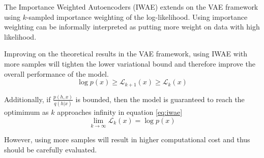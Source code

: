 

The Importance Weighted Autoencoders\cite{iwae:2015} (IWAE) extends on the VAE framework using $k$-sampled importance weighting of the log-likelihood.
Using importance weighting can be informally interpreted as putting more weight on data with high likelihood.

Improving on the theoretical results in the VAE framework, using IWAE with more samples will tighten the lower variational bound and therefore improve the overall performance of the model.
\begin{equation*}
\log p(x) \geq \mathcal{L}_{k+1}(x) \geq \mathcal{L}_{k}(x)
\end{equation*}

Additionally, if $\frac{p(h,x)}{q(h|x)}$ is bounded, then the model is guaranteed to reach the optimimum as $k$ approaches infinity in equation \ref{eq:iwae}
\begin{equation}
\label{eq:iwae}
\lim_{k \rightarrow \infty} \mathcal{L}_{k}(x) = \log p(x)
\end{equation}

However, using more samples will result in higher computational cost and thus should be carefully evaluated.

